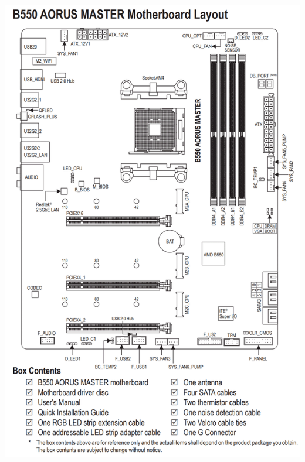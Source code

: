 \documentclass{article}
\begin{document}
          \begin{minipage}{\textwidth}
            \includegraphics[scale=0.25]{img/B550AORUSMasterDiagram.png}
          \end{minipage}
        

  \newpage
\end{document}
